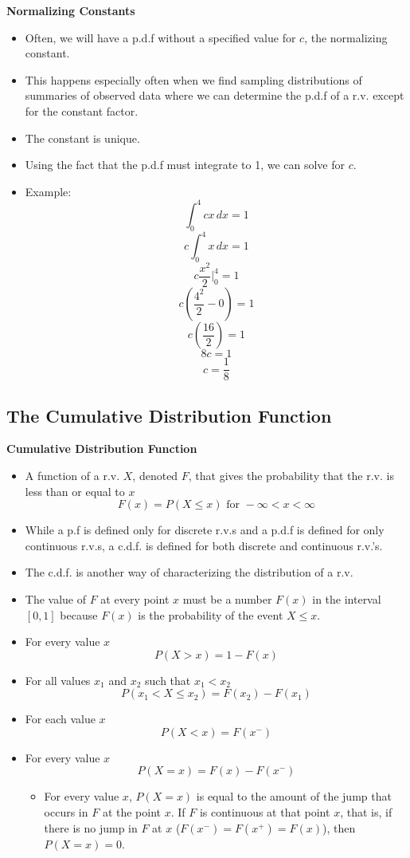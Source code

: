 \documentclass[11pt]{article}
\begin{document}
\textbf{Normalizing Constants}
\begin{itemize}
    \item Often, we will have a p.d.f without a specified value for $c$, 
    the normalizing constant. 
    \item This happens especially often when we find sampling distributions 
    of summaries of observed data where we can determine the p.d.f of a 
    r.v. except for the constant factor.
    \item The constant is unique.
    \item Using the fact that the p.d.f must integrate to 1, we can solve 
    for $c$.
    \item Example:
    \[\int_{0}^{4}cx \,dx = 1\]
    \[c\int_{0}^{4}x \,dx = 1\]
    \[c\frac{x^2}{2}\rvert_0^4 = 1\]
    \[c\left(\frac{4^2}{2}-0\right)= 1\]
    \[c\left(\frac{16}{2}\right)= 1\]
    \[8c= 1\]
    \[c= \frac{1}{8}\]
\end{itemize}

\subsection{The Cumulative Distribution Function}   

\textbf{Cumulative Distribution Function}
\begin{itemize}
    \item A function of a r.v. $X$, denoted $F$, that gives the probability that the r.v. is 
    less than or equal to $x$ \[F(x)=P(X \le x) \text{ for } -\infty < x < \infty\]
    \item While a p.f is defined only for discrete r.v.s and a p.d.f is defined for only 
    continuous r.v.s, a c.d.f. is defined for both discrete and continuous r.v.'s.
    \item The c.d.f. is another way of characterizing the distribution of a r.v.
    \item The value of $F$ at every point $x$ must be a number $F(x)$ in the interval $[0,1]$
    because $F(x)$ is the probability of the event ${X \le x}$.
    \item For every value $x$
    \[P(X > x) = 1 - F(x)\]
    \item For all values $x_1$ and $x_2$ such that $x_1 < x_2$
    \[P(x_1 < X \le x_2) = F(x_2) - F(x_1)\]
    \item For each value $x$
    \[P(X < x) = F(x^-)\]
    \item For every value $x$
    \[P(X=x) = F(x) - F(x^-)\]
    \begin{itemize}
        \item For every value $x$, $P(X=x)$ is equal to the amount of the jump that occurs in 
        $F$ at the point $x$. If $F$ is continuous at that point $x$, that is, if there is no 
        jump in $F$ at $x$ ($F(x^-)=F(x^+)=F(x)$), then $P(X=x)=0$.
    \end{itemize}
\end{itemize}
\end{document}
